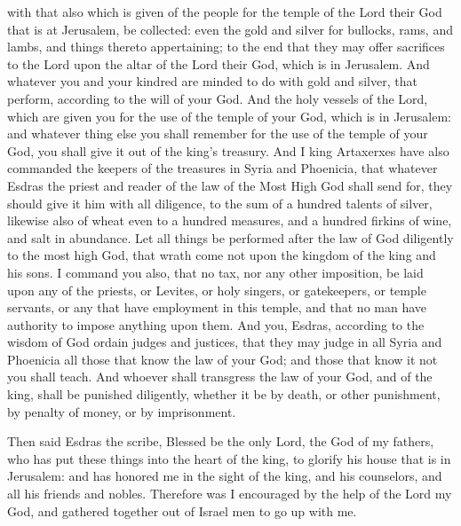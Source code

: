 {with that also which is given of the people for the temple of the Lord their God that is at Jerusalem, be collected: even the gold and silver for bullocks, rams, and lambs, and things thereto appertaining;
to the end that they may offer sacrifices to the Lord upon the altar of the Lord their God, which is in Jerusalem.
And whatever you and your kindred are minded to do with gold and silver, that perform, according to the will of your God.
And the holy vessels of the Lord, which are given you for the use of the temple of your God, which is in Jerusalem:
and whatever thing else you shall remember for the use of the temple of your God, you shall give it out of the king’s treasury.
And I king Artaxerxes have also commanded the keepers of the treasures in Syria and Phoenicia, that whatever Esdras the priest and reader of the law of the Most High God shall send for, they should give it him with all diligence,
to the sum of a hundred talents of silver, likewise also of wheat even to a hundred
 measures, and a hundred firkins of wine, and
 salt in abundance.
Let all things be performed after the law of God diligently to the most high God, that wrath come not upon the kingdom of the king and his sons.
I command you also, that no tax, nor any other imposition, be laid upon any of the priests, or Levites, or holy singers, or gatekeepers, or temple servants, or any that have employment in this temple, and that no man have authority to impose anything upon them.
And you, Esdras, according to the wisdom of God ordain judges and justices, that they may judge in all Syria and Phoenicia all those that know the law of your God; and those that know it not you shall teach.
And whoever shall transgress the law of your God, and of the king, shall be punished diligently, whether it be by death, or other punishment, by penalty of money, or by
 imprisonment.
\par }{\PP {}Then said Esdras the scribe, Blessed be the only Lord, the God of my fathers, who has put these things into the heart of the king, to glorify his house that is in Jerusalem:
and has honored me in the sight of the king, and his counselors, and all his friends and nobles.
Therefore was I encouraged by the help of the Lord my God, and gathered together out of Israel men to go up with me.
}
